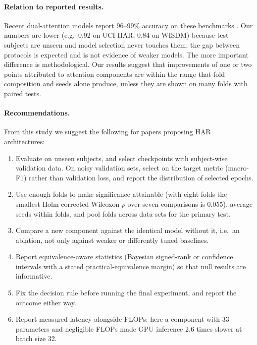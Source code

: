 \documentclass[11pt,a4paper]{article}
\begin{document}
\paragraph{Relation to reported results.}
Recent dual-attention models report 96--99\% accuracy on these benchmarks \cite{zhang2025dualinaba,he2025tgahar}. Our numbers are lower (e.g.\ 0.92 on UCI-HAR, 0.84 on WISDM) because test subjects are unseen and model selection never touches them; the gap between protocols is expected \cite{gholamiangonabadi2020deep,jordao2018human} and is not evidence of weaker models. The more important difference is methodological. Our results suggest that improvements of one or two points attributed to attention components are within the range that fold composition and seeds alone produce, unless they are shown on many folds with paired tests.

\paragraph{Recommendations.}
From this study we suggest the following for papers proposing HAR architectures:
\begin{enumerate}
  \item Evaluate on unseen subjects, and select checkpoints with subject-wise validation data. On noisy validation sets, select on the target metric (macro-F1) rather than validation loss, and report the distribution of selected epochs.
  \item Use enough folds to make significance attainable (with eight folds the smallest Holm-corrected Wilcoxon $p$ over seven comparisons is 0.055), average seeds within folds, and pool folds across data sets for the primary test.
  \item Compare a new component against the identical model without it, i.e.\ an ablation, not only against weaker or differently tuned baselines.
  \item Report equivalence-aware statistics (Bayesian signed-rank or confidence intervals with a stated practical-equivalence margin) so that null results are informative.
  \item Fix the decision rule before running the final experiment, and report the outcome either way.
  \item Report measured latency alongside FLOPs: here a component with 33 parameters and negligible FLOPs made GPU inference 2.6 times slower at batch size 32.
\end{enumerate}
\end{document}
